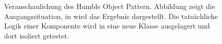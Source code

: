       \begin{figure}[tbh]
      \centering
      \begin{minipage}[c]{0.8\textwidth}
     \hfill
     \hfill
     \caption[Veranschaulichung des \textit{Humble Object Pattern}.]{Veranschaulichung des Humble Object Pattern. Abbildung  zeigt die Ausgangssituation, in  wird das Ergebnis dargestellt. Die tatsächliche Logik einer Komponente wird in eine neue Klasse ausgelagert und dort isoliert getestet.}
     \label{fig:humble_object_pattern}
\end{minipage}
   \end{figure}


